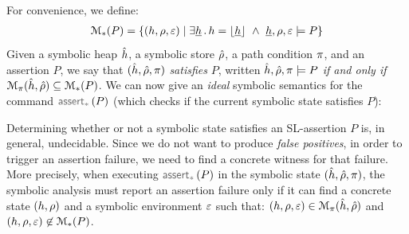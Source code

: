 %
For convenience, we define: 
{\small 
\begin{align}
\mathcal{M}_{*}(P) = \left\{ (h, \rho, \varepsilon) \mid \exists \underline{h} \, . \,  h = \lfloor \underline{h} \rfloor \ \wedge \ \underline{h}, \rho, \varepsilon \models P  \right\}
\end{align}}
\hspace{-2pt}Given a symbolic heap $\hat{h}$, a symbolic store $\hat\rho$, a path condition $\pi$, and 
an assertion $P$, we say that  $(\hat{h}, \hat\rho, \pi)$ \emph{satisfies} $P$, 
written $\hat{h}, \hat\rho, \pi \models P$ \emph{if and only if}
$\mathcal{M}_{\pi}(\hat{h}, \hat\rho) \subseteq \mathcal{M}_{*}(P)$. 
%
We can now give an \emph{ideal} symbolic semantics for the command $\sepassert(P)$ (which checks
if the current symbolic state satisfies $P$): 
{\small {}}
\hspace{-3pt}Determining whether or not a symbolic state satisfies an SL-assertion $P$ is, in general, 
undecidable. Since we do not want to produce \emph{false positives}, in order to trigger 
an assertion failure, we need to find a concrete witness for that failure. More precisely, when executing 
$\sepassert(P)$ in the symbolic state $(\hat{h}, \hat\rho, \pi)$, the symbolic analysis must  
report an assertion failure only if it can find a concrete state $(h, \rho)$  and a symbolic environment 
$\varepsilon$ such that: 
$(h, \rho, \varepsilon) \in \mathcal{M}_{\pi}(\hat{h}, \hat\rho)$ and
$(h, \rho, \varepsilon) \not\in \mathcal{M}_{*}(P)$.

